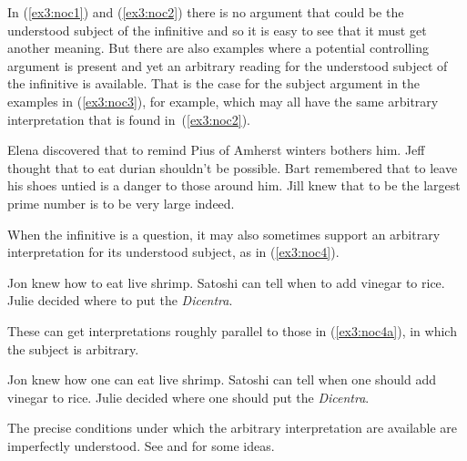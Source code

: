 In (\ref{ex3:noc1}) and (\ref{ex3:noc2}) there is no argument that could be the understood subject of the infinitive and so it is easy to see that it must get another meaning. But there are also examples where a potential controlling argument is present and yet an arbitrary reading for the understood subject of the infinitive is available. That is the case for the subject argument in the examples in (\ref{ex3:noc3}), for example, which may all have the same arbitrary interpretation that is found in~(\ref{ex3:noc2}).
\begin{exe}
\ex \label{ex3:noc3} 
\begin{xlist}
	\ex Elena discovered that to remind Pius of Amherst winters bothers him.
	\ex Jeff thought that to eat durian shouldn't be possible.
	\ex Bart remembered that to leave his shoes untied is a danger to those around him.
	\ex Jill knew that to be the largest prime number is to be very large indeed.
\end{xlist}
\end{exe}
When the infinitive is a question, it may also sometimes support an arbitrary interpretation for its understood subject, as in (\ref{ex3:noc4}).
\begin{exe}
\ex \label{ex3:noc4} 
\begin{xlist}
	\ex Jon knew how to eat live shrimp.
	\ex Satoshi can tell when to add vinegar to rice.
	\ex Julie decided where to put the \emph{Dicentra}.
\end{xlist}
\end{exe}
These can get interpretations roughly parallel to those in (\ref{ex3:noc4a}), in which the subject is arbitrary.
\begin{exe}
\ex \label{ex3:noc4a} 
\begin{xlist}
	\ex Jon knew how one can eat live shrimp.
	\ex Satoshi can tell when one should add vinegar to rice.
	\ex Julie decided where one should put the \emph{Dicentra}.
\end{xlist}
\end{exe}
The precise conditions under which the arbitrary interpretation are available are imperfectly understood. See \citet{Williams:1980,Williams:1989} and \citet{Landau:2004} for some ideas.

